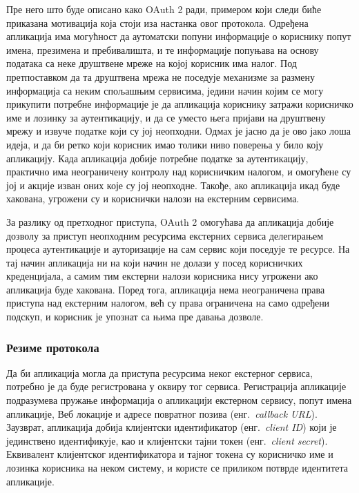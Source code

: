 \documentclass[12pt,oneside]{memoir}
\begin{document}
Пре него што буде описано како OAuth 2 ради, примером који следи биће приказана мотивација која стоји иза настанка овог протокола. Одређена апликација има могућност да аутоматски попуни информације о кориснику попут имена, презимена и пребивалишта, и те информације попуњава на основу података са неке друштвене мреже на којој корисник има налог. Под претпоставком да та друштвена мрежа не поседује механизме за размену информација са неким спољашњим сервисима, једини начин којим се могу прикупити потребне информације је да апликација кориснику затражи корисничко име и лозинку за аутентикацију, и да се уместо њега пријави на друштвену мрежу и извуче податке који су јој неопходни. Одмах је јасно да је ово јако лоша идеја, и да би ретко који корисник имао толики ниво поверења у било коју апликацију. Када апликација добије потребне податке за аутентикацију, практично има неограничену контролу над корисничким налогом, и омогућене су јој и акције изван оних које су јој неопходне. Такође, ако апликација икад буде хакована, угрожени су и кориснички налози на екстерним сервисима.

За разлику од претходног приступа, OAuth 2 омогућава да апликација добије дозволу за приступ неопходним ресурсима екстерних сервиса делегирањем процеса аутентикације и ауторизације на сам сервис који поседује те ресурсе. На тај начин апликација ни на који начин не долази у посед корисничких креденцијала, а самим тим екстерни налози корисника нису угрожени ако апликација буде хакована. Поред тога, апликација нема неограничена права приступа над екстерним налогом, већ су права ограничена на само одређени подскуп, и корисник је упознат са њима пре давања дозволе.

\subsubsection{Резиме протокола}
Да би апликација могла да приступа ресурсима неког екстерног сервиса, потребно је да буде регистрована у оквиру тог сервиса. Регистрација апликације подразумева пружање информација о апликацији екстерном сервису, попут имена апликације, Веб локације и адресе повратног позива (енг.~\textit{callback URL}). Заузврат, апликација добија клијентски идентификатор (енг.~\textit{client ID}) који је јединствено идентификује, као и клијентски тајни токен (енг.~\textit{client secret}). Еквивалент клијентског идентификатора и тајног токена су корисничко име и лозинка корисника на неком систему, и користе се приликом потврде идентитета апликације.
\end{document}
